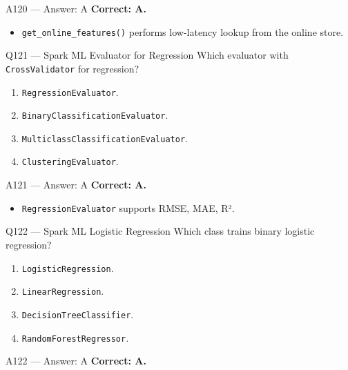 \documentclass[aspectratio=169,9pt]{beamer}
\begin{document}
	\begin{frame}{A120 --- Answer: A}
		\textbf{Correct: A.}
		\begin{itemize}
			\item \texttt{get\_online\_features()} performs low-latency lookup from the online store.
		\end{itemize}
	\end{frame}
	
	
	\begin{frame}{Q121 --- Spark ML Evaluator for Regression}
		Which evaluator with \texttt{CrossValidator} for regression?
		\begin{enumerate}[label=\Alph*.]
			\item \texttt{RegressionEvaluator}.
			\item \texttt{BinaryClassificationEvaluator}.
			\item \texttt{MulticlassClassificationEvaluator}.
			\item \texttt{ClusteringEvaluator}.
		\end{enumerate}
	\end{frame}
	
	\begin{frame}{A121 --- Answer: A}
		\textbf{Correct: A.}
		\begin{itemize}
			\item \texttt{RegressionEvaluator} supports RMSE, MAE, R².
		\end{itemize}
	\end{frame}
	
	\begin{frame}{Q122 --- Spark ML Logistic Regression}
		Which class trains binary logistic regression?
		\begin{enumerate}[label=\Alph*.]
			\item \texttt{LogisticRegression}.
			\item \texttt{LinearRegression}.
			\item \texttt{DecisionTreeClassifier}.
			\item \texttt{RandomForestRegressor}.
		\end{enumerate}
	\end{frame}
	
	\begin{frame}{A122 --- Answer: A}
		\textbf{Correct: A.}
	\end{frame}
	
\end{document}
